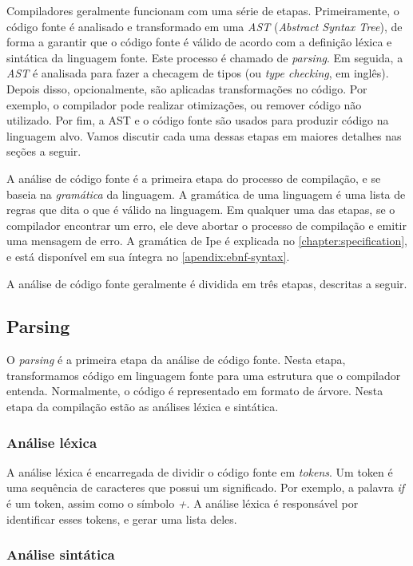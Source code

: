 Compiladores geralmente funcionam com uma série de etapas. Primeiramente, o
código fonte é analisado e transformado em uma \textit{AST}
(\textit{Abstract Syntax Tree}), de forma a garantir que o código fonte é válido de
acordo com a definição léxica e sintática da linguagem fonte. Este processo é
chamado de \textit{parsing}. Em seguida, a \textit{AST} é analisada para fazer
a checagem de tipos (ou \textit{type checking}, em inglês).  Depois disso,
opcionalmente, são aplicadas transformações no código. Por exemplo, o compilador
pode realizar otimizações, ou remover código não utilizado. Por fim, a AST e o
código fonte são usados para produzir código na linguagem alvo. Vamos discutir
cada uma dessas etapas em maiores detalhes nas seções a seguir.

A análise de código fonte é a primeira etapa do processo de compilação, e se
baseia na \textit{gramática} da linguagem. A gramática de uma linguagem é uma lista
de regras que dita o que é válido na linguagem. Em qualquer uma das etapas, se o
compilador encontrar um erro, ele deve abortar o processo de compilação e emitir
uma mensagem de erro. A gramática de Ipe é explicada no \autoref{chapter:specification},
e está disponível em sua íntegra no \autoref{apendix:ebnf-syntax}.

A análise de código fonte geralmente é dividida em três etapas, descritas a seguir.

\subsection{Parsing}

O \textit{parsing} é a primeira etapa da análise de código fonte. Nesta etapa,
transformamos código em linguagem fonte para uma estrutura que o compilador
entenda. Normalmente, o código é representado em formato de árvore. Nesta etapa
da compilação estão as análises léxica e sintática.

\subsubsection{Análise léxica}

A análise léxica é encarregada de dividir o código fonte em \textit{tokens}. Um
token é uma sequência de caracteres que possui um significado. Por exemplo, a
palavra \textit{if} é um token, assim como o símbolo \textit{+}. A análise léxica
é responsável por identificar esses tokens, e gerar uma lista deles.


\subsubsection{Análise sintática}

